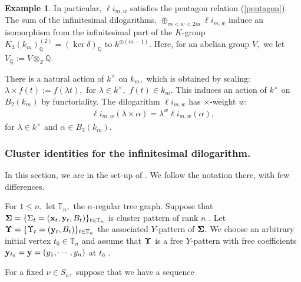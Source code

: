 \documentclass{amsart}
\theoremstyle{definition}
\newtheorem{example}[theorem]{Example}
\numberwithin{equation}{subsection}
\begin{document}
\begin{example}
In particular,  $\ell i_{m,w}$ satisfies the pentagon relation (\ref{pentagon}). The sum of the infinitesimal dilogarithms, \(\oplus _{m<w<2m} \ell i_{m,w}\) induce an isomorphism from the infinitesimal part of the $K$-group $K_{3}(k_{m})^{(2)} _{\mathbb{Q}}=(\ker{\delta})_{\mathbb{Q}}$ to $k^{\oplus (m-1)}.$ Here, for an abelian group  $V,$ we let $V_{\mathbb{Q}}:=V\otimes _{\mathbb{Z}}\mathbb{Q}.$ 

There is a natural action of $k^{\times}$ on $k_{m},$ which is obtained by scaling: \( \lambda \times f(t):=f(\lambda t),\) for $\lambda \in k^{\times},$ $f(t) \in k_{m}.$ This induces an action of $k^{\times}$ on $B_{2}(k_{m})$ by functoriality.  The dilogarithm $\ell i_{m,w}$ has $\times$-weight $w:$   
\begin{eqnarray}
\ell i_{m,w}(\lambda \times \alpha)=\lambda ^{w} \ell i_{m,w}(\alpha),    
\end{eqnarray}
for $\lambda \in k^{\times}$ and $\alpha \in B_{2}(k_{m}).$     
\end{example}


\subsubsection{Cluster identities for the infinitesimal dilogarithm.} In this section, we are in the set-up of \cite[]{nak}. We follow the notation there, with few differences. 

For  $1\leq n,$ let $\mathbb{T}_{n},$ the $n$-regular tree graph. Suppose that ${\bf \Sigma}=\{\Sigma_{t}=({\bf x}_t,{\bf y}_{t},B_{t} ) \}_{t \in \mathbb{T}_n}$ is cluster pattern of rank $n$ \cite[Definition 2.9]{nak}. Let ${\bf \Upsilon}=\{\Upsilon_t= ({\bf y}_{t},B_{t} )\}_{t\in \mathbb{T}_n}$ the associated $Y$-pattern of ${\bf \Sigma}.$ We choose an arbitrary initial vertex $t_{0} \in \mathbb{T}_{n}$ and  assume that ${\bf \Upsilon}$ is a free $Y$-pattern with free coefficients ${\bf y}_{t_0}={\bf y}=(y_{1}, \cdots, y_{n})$  at $t_{0}$   \cite[.2]{nak}.


For a fixed  $\nu \in S_{n},$ suppose that we have a  sequence 

\end{document}
